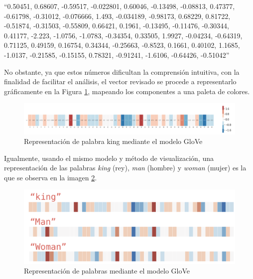 \documentclass[
  12pt,
  openany]{book}
\begin{document}
``0.50451, 0.68607, -0.59517, -0.022801, 0.60046, -0.13498, -0.08813, 0.47377, -0.61798, -0.31012, -0.076666, 1.493, -0.034189, -0.98173, 0.68229, 0.81722, -0.51874, -0.31503, -0.55809, 0.66421, 0.1961, -0.13495, -0.11476, -0.30344, 0.41177, -2.223, -1.0756, -1.0783, -0.34354, 0.33505, 1.9927, -0.04234, -0.64319, 0.71125, 0.49159, 0.16754, 0.34344, -0.25663, -0.8523, 0.1661, 0.40102, 1.1685, -1.0137, -0.21585, -0.15155, 0.78321, -0.91241, -1.6106, -0.64426, -0.51042''

No obstante, ya que estos números dificultan la comprensión intuitiva, con la finalidad de facilitar el análisis, el vector revisado se procede a representarlo gráficamente en la Figura \ref{fig:embking}, mapeando los componentes a una paleta de colores.

\begin{figure}

{\centering \includegraphics[width=0.95\linewidth]{images/03-marco-teorico/embking} 

}

\caption{Representación de palabra king mediante el modelo GloVe}\label{fig:embking}
\end{figure}

Igualmente, usando el mismo modelo y método de visualización, una representación de las palabras \emph{king} (rey), \emph{man} (hombre) y \emph{woman} (mujer) es la que se observa en la imagen \ref{fig:GloVeEmbedd}.

\begin{figure}

{\centering \includegraphics[width=0.95\linewidth]{images/03-marco-teorico/embedding} 

}

\caption{Representación de palabras mediante el modelo GloVe}\label{fig:GloVeEmbedd}
\end{figure}
\end{document}
